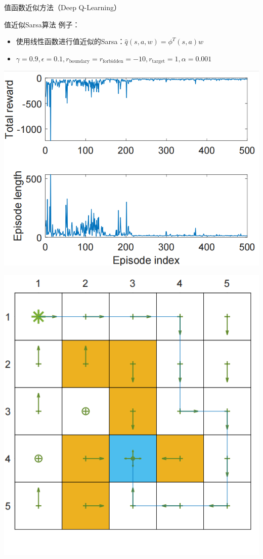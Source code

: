 \begin{section}{值函数近似方法\alert{（Deep Q-Learning）}}
\begin{frame}{值近似Sarsa算法}
    例子：
    \begin{itemize}
        \item 使用\alert{线性函数}进行值近似的Sarsa：$\hat{q}(s,a,w)=\phi^T(s,a)w$
        \item $\gamma=0.9,\epsilon=0.1,r_\text{boundary}=r_\text{forbidden}=-10, r_\text{target}=1,\alpha=0.001$
    \end{itemize}
    \begin{center}
        \begin{minipage}{0.3\textwidth}
            \centering
            \includegraphics[width=\linewidth]{assets/valuesarsaepisode.jpg}
        \end{minipage}
        \hspace{1cm}
        \begin{minipage}{0.3\textwidth}
            \centering
            \includegraphics[width=\linewidth]{assets/valuesarsapolicy.jpg}

\end{minipage}
\end{center}
\end{frame}
\end{section}
